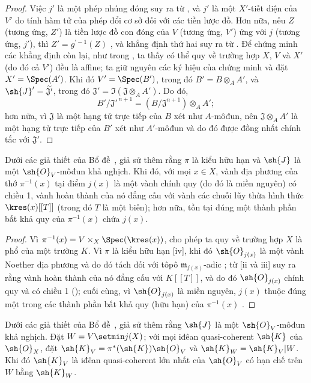 \documentclass[oneside,10pt]{amsart}
\let\EGAOriginalLabel\label
\renewcommand{\label}[1]{\phantomsection\EGAOriginalLabel{#1}}
\begin{document}
\begin{proof}
Việc $j'$ là một phép nhúng đóng suy ra từ , và $j'$ là một $X'$-tiết diện của $V'$ do tính hàm tử của phép đổi cơ sở đối với các tiền lược đồ.
Hơn nữa, nếu $Z$ (tương ứng, $Z'$) là tiền lược đồ con đóng của $V$ (tương ứng, $V'$) ứng với $j$ (tương ứng, $j'$), thì $Z'=g^{'-1}(Z)$ , và khẳng định thứ hai suy ra từ .
Để chứng minh các khẳng định còn lại, như trong , ta thấy có thể quy về trường hợp $X$, $V$ và $X'$ (do đó cả $V'$) đều là affine;
ta giữ nguyên các ký hiệu của chứng minh  và đặt $X'=\Spec(A')$.
Khi đó $V'=\Spec(B')$, trong đó $B'=B\otimes_A A'$, và $\sh{J}'=\widetilde{\mathfrak{J}'}$, trong đó $\mathfrak{J}'=\Im(\mathfrak{J}\otimes_A A')$.
Do đó,
\[
  B'/\mathfrak{J}'^{\,n+1}
  =(B/\mathfrak{J}^{n+1})\otimes_A A';
\]
hơn nữa, vì $\mathfrak{J}$ là một hạng tử trực tiếp của $B$ xét như $A$-môđun, nên $\mathfrak{J}\otimes_A A'$ là một hạng tử trực tiếp của $B'$ xét như $A'$-môđun và do đó được đồng nhất chính tắc với $\mathfrak{J}'$.
\end{proof}

\begin{corollary}[8.10.3]
\label{II.8.10.3}
Dưới các giả thiết của Bổ đề~, giả sử thêm rằng $\pi$ là kiểu hữu hạn và $\sh{J}$ là một $\sh{O}_V$-môđun khả nghịch.
Khi đó, với mọi $x\in X$, vành địa phương của thớ $\pi^{-1}(x)$ tại điểm $j(x)$ là một vành chính quy (do đó là miền nguyên) có chiều 1, vành hoàn thành của nó đẳng cấu với vành các chuỗi lũy thừa hình thức $\kres(x)[[T]]$ (trong đó $T$ là một biến);
hơn nữa, tồn tại đúng một thành phần bất khả quy của $\pi^{-1}(x)$ chứa $j(x)$.
\end{corollary}

\begin{proof}
Vì $\pi^{-1}(x)=V\times_X\Spec(\kres(x))$,  cho phép ta quy về trường hợp $X$ là phổ của một trường $K$.
Vì $\pi$ là kiểu hữu hạn [iv], khi đó $\sh{O}_{j(x)}$ là một vành Noether địa phương và do đó tách đối với tôpô $\mathfrak{m}_{j(x)}$-adic ;
từ [ii và iii] suy ra rằng vành hoàn thành của nó đẳng cấu với $K[[T]]$, và do đó $\sh{O}_{j(x)}$ chính quy và có chiều 1 (\cite[p.~17-01, th.~1]{I-1});
cuối cùng, vì $\sh{O}_{j(x)}$ là miền nguyên, $j(x)$ thuộc đúng một trong các thành phần bất khả quy (hữu hạn) của $\pi^{-1}(x)$ .
\end{proof}

\begin{corollary}[8.10.4]
\label{II.8.10.4}
Dưới các giả thiết của Bổ đề~, giả sử thêm rằng $\sh{J}$ là một $\sh{O}_V$-môđun khả nghịch.
Đặt $W=V\setmin j(X)$;
với mọi iđêan quasi-coherent $\sh{K}$ của $\sh{O}_X$, đặt $\sh{K}_V=\pi^*(\sh{K})\sh{O}_V$ và $\sh{K}_W=\sh{K}_V|W$.
Khi đó $\sh{K}_V$ là iđêan quasi-coherent lớn nhất của $\sh{O}_V$ có hạn chế trên $W$ bằng $\sh{K}_W$.
\end{corollary}
\end{document}
